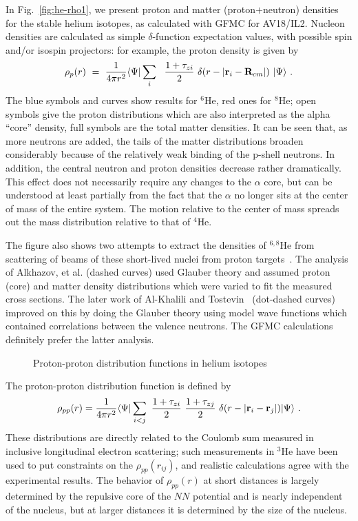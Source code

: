 In Fig.~\ref{fig:he-rho1}, we present proton and matter (proton$+$neutron) 
densities for the stable helium isotopes, as calculated with GFMC for AV18/IL2.
Nucleon densities are calculated as simple $\delta$-function expectation 
values, with possible spin and/or isospin projectors: for example, the
proton density is given by
\begin{equation}
\rho_{p}(r) \ = \ \frac{1}{4 \pi r^2}
\langle \Psi | \sum_i \ 
\ \frac { 1 + \tau_{zi}}{2} \ \delta ( r - | {\bf r}_i - {\bf R}_{cm} | )
\ | \Psi \rangle \ .
\end{equation}
The blue symbols and curves show results for $^6$He, red ones for $^8$He;
open symbols give the proton distributions which are also interpreted
as the alpha ``core'' density, full symbols are the total matter densities.
It can be seen that, as more neutrons are added, the tails of the matter 
distributions broaden considerably because of the relatively weak binding
of the p-shell neutrons.
In addition, the central neutron and proton densities decrease rather
dramatically.
This effect does not necessarily require any changes to the $\alpha$
core, but can be understood at least partially from the fact that the
$\alpha$ no longer sits at the center of mass of the entire system.
The motion relative to the center of mass spreads out the mass distribution
relative to that of $^4$He.  

The figure also shows two attempts to extract the densities of
$^{6,8}$He from scattering of beams of these short-lived nuclei from
proton targets~\cite{Alkhazov}.  The analysis of Alkhazov, et
al. (dashed curves) used Glauber theory and assumed proton (core) and
matter density distributions which were varied to fit the measured cross
sections.  The later work of Al-Khalili and Tostevin~\cite{Al-Khalili}
(dot-dashed curves) improved on this by doing the Glauber theory using
model wave functions which contained correlations between the 
valence neutrons.
The GFMC calculations definitely prefer the latter analysis.

\begin{figure}
\centerline{}
\caption{Proton-proton distribution functions in helium isotopes}
\label{fig:he-pp}
\end{figure}

The proton-proton distribution function is defined by
\begin{equation}
\rho_{pp} (r) = \frac{1}{4 \pi r^2}
\langle \Psi | \sum_{i<j} \ \frac{1 + \tau_{zi}}{2}
\ \frac { 1 + \tau_{zj}}{2} \ \delta ( r - |{\bf r}_i - {\bf r}_j|)|
\Psi \rangle \ .
\end{equation}
These distributions are directly related to the Coulomb sum measured in
inclusive longitudinal electron scattering; such measurements in $^3$He have
been used to put constraints on the $\rho_{pp} (r_{ij})$, and realistic
calculations agree with the experimental results\cite{SWC93}.
The behavior of $\rho_{pp} (r)$ at short distances is largely determined
by the repulsive core of the $N\!N$ potential and is nearly independent
of the nucleus, but at larger distances it is determined by the size
of the nucleus.

